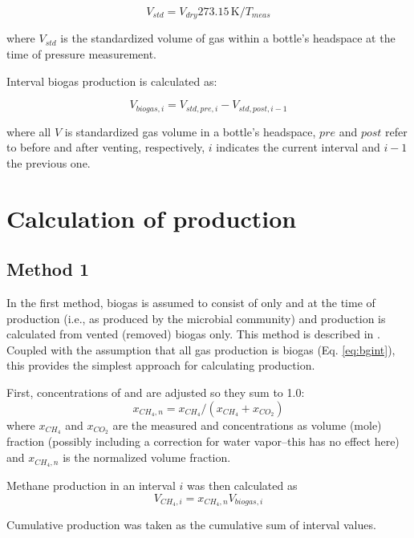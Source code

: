 \documentclass[]{article}
\newcommand{\unit}[1]{\ensuremath{\, \mathrm{#1}}}
\begin{document}
\begin{equation}
  \label{eq:bgstd}
  V_{std} = V_{dry} 273.15 \unit{K}/T_{meas}
\end{equation}

where $V_{std}$ is the standardized volume of gas within a bottle's headspace at the time of pressure measurement.

Interval biogas production is calculated as:

\begin{equation}
  \label{eq:bgint}
  V_{biogas, i} = V_{std, pre, i} - V_{std, post, i - 1}
\end{equation}

where all $V$ is standardized gas volume in a bottle's headspace, $pre$ and $post$ refer to before and after venting, respectively, $i$ indicates the current interval and $i-1$ the previous one.

\section{Calculation of  production}
\subsection{Method 1}
In the first method, biogas is assumed to consist of only  and  at the time of production (i.e., as produced by the microbial community) and  production is calculated from vented (removed) biogas only.
This method is described in \cite{brian1991}.
Coupled with the assumption that all gas production is biogas (Eq. \ref{eq:bgint}), this provides the simplest approach for calculating  production.

First, concentrations of  and  are adjusted so they sum to 1.0:
\begin{equation}
  x_{CH_4, n} = x_{CH_4}/(x_{CH_4} + x_{CO_2})
\end{equation}
where $x_{CH_4}$ and $x_{CO_2}$ are the measured  and  concentrations as volume (mole) fraction (possibly including a correction for water vapor--this has no effect here) and $x_{CH_4, n}$ is the normalized  volume fraction.

Methane production in an interval $i$ was then calculated as
\begin{equation}
  V_{CH_4, i} = x_{CH_4, n} V_{biogas, i}
\end{equation}

Cumulative production was taken as the cumulative sum of interval values. 
\end{document}
